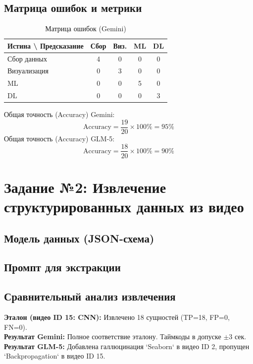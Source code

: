 \documentclass[oneside,a4paper,14pt]{extarticle}
\begin{document}
\subsection{Матрица ошибок и метрики}
\begin{table}[H]
\centering
\caption{Матрица ошибок (Gemini)}
\begin{tabular}{|l|c|c|c|c|}
\hline
\textbf{Истина \textbackslash{} Предсказание} & \textbf{Сбор} & \textbf{Виз.} & \textbf{ML} & \textbf{DL} \\ \hline
Сбор данных & 4 & 0 & 0 & 0 \\ \hline
Визуализация & 0 & 3 & 0 & 0 \\ \hline
ML & 0 & 0 & 5 & 0 \\ \hline
DL & 0 & 0 & 0 & 3 \\ \hline
\end{tabular}
\end{table}
\noindent
Общая точность (Accuracy) Gemini:
\begin{equation}
\text{Accuracy} = \frac{19}{20} \times 100\% = 95\%
\end{equation}
Общая точность (Accuracy) GLM-5:
\begin{equation}
\text{Accuracy} = \frac{18}{20} \times 100\% = 90\%
\end{equation}

\newpage
\section{Задание №2: Извлечение структурированных данных из видео}
\subsection{Модель данных (JSON-схема)}


\newpage
\subsection{Промпт для экстракции}


\subsection{Сравнительный анализ извлечения}
\noindent
\textbf{Эталон (видео ID 15: CNN):} Извлечено 18 сущностей (TP=18, FP=0, FN=0).\\
\textbf{Результат Gemini:} Полное соответствие эталону. Таймкоды в допуске $\pm 3$ сек.\\
\textbf{Результат GLM-5:} Добавлена галлюцинация `Seaborn` в видео ID 2, пропущен `Backpropagation` в видео ID 15. \\
\end{document}
